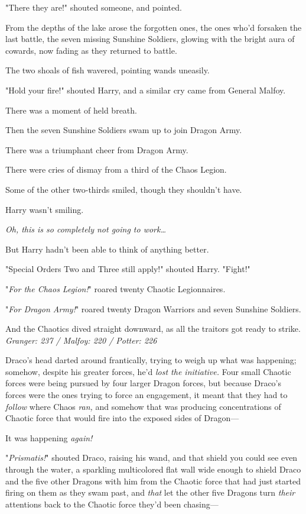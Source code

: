 "There they are!" shouted someone, and pointed.

From the depths of the lake arose the forgotten ones, the ones who'd forsaken 
the last battle, the seven missing Sunshine Soldiers, glowing with the bright 
aura of cowards, now fading as they returned to battle.

The two shoals of fish wavered, pointing wands uneasily.

"Hold your fire!" shouted Harry, and a similar cry came from General Malfoy.

There was a moment of held breath.

Then the seven Sunshine Soldiers swam up to join Dragon Army.

There was a triumphant cheer from Dragon Army.

There were cries of dismay from a third of the Chaos Legion.

Some of the other two-thirds smiled, though they shouldn't have.

Harry wasn't smiling.

\emph{Oh, this is so completely not going to work{\ldots}}

But Harry hadn't been able to think of anything better.

"Special Orders Two and Three still apply!" shouted Harry. "Fight!"

"\emph{For the Chaos Legion!}" roared twenty Chaotic Legionnaires.

"\emph{For Dragon Army!}" roared twenty Dragon Warriors and seven Sunshine 
Soldiers.

And the Chaotics dived straight downward, as all the traitors got ready to 
strike.
\sbreak
\emph{Granger: 237 / Malfoy: 220 / Potter: 226}

Draco's head darted around frantically, trying to weigh up what was happening; 
somehow, despite his greater forces, he'd \emph{lost the initiative.} Four 
small Chaotic forces were being pursued by four larger Dragon forces, but 
because Draco's forces were the ones trying to force an engagement, it meant 
that they had to \emph{follow} where Chaos \emph{ran,} and somehow that was 
producing concentrations of Chaotic force that would fire into the exposed 
sides of Dragon---

It was happening \emph{again!}

"\emph{Prismatis!}" shouted Draco, raising his wand, and that shield you could 
see even through the water, a sparkling multicolored flat wall wide enough to 
shield Draco and the five other Dragons with him from the Chaotic force that 
had just started firing on them as they swam past, and \emph{that} let the 
other five Dragons turn \emph{their} attentions back to the Chaotic force 
they'd been chasing---


